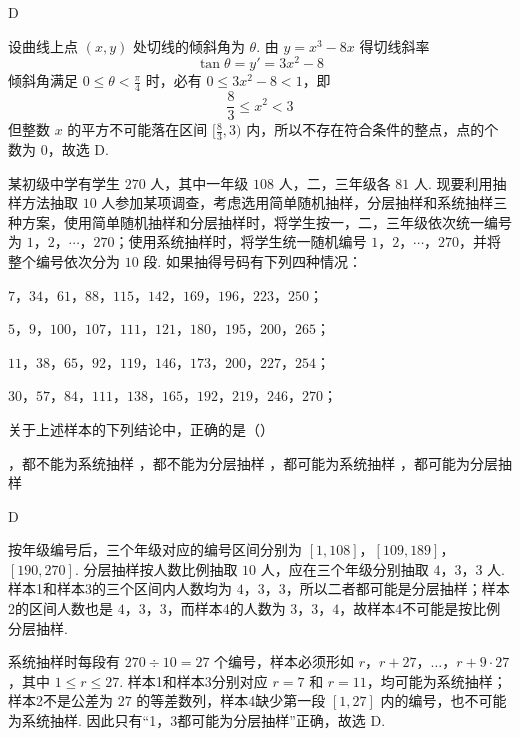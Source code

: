 \begin{answer}
D
\end{answer}

\begin{solution}
设曲线上点 \((x,y)\) 处切线的倾斜角为 \(\theta\). 由 \(y=x^3-8x\) 得切线斜率
\[
\tan\theta=y'=3x^2-8
\]
倾斜角满足 \(0\leqslant\theta<\frac\pi4\) 时，必有 \(0\leqslant3x^2-8<1\)，即
\[
\frac83\leqslant x^2<3
\]
但整数 \(x\) 的平方不可能落在区间 \([\frac83,3)\) 内，所以不存在符合条件的整点，点的个数为 \(0\)，故选 D.
\end{solution}

\begin{problem}
某初级中学有学生 \(270\) 人，其中一年级 \(108\) 人，二，三年级各 \(81\) 人. 现要利用抽样方法抽取 \(10\) 人参加某项调查，考虑选用简单随机抽样，分层抽样和系统抽样三种方案，使用简单随机抽样和分层抽样时，将学生按一，二，三年级依次统一编号为 \(1\)，\(2\)，\(\cdots\)，\(270\)；使用系统抽样时，将学生统一随机编号 \(1\)，\(2\)，\(\cdots\)，\(270\)，并将整个编号依次分为 \(10\) 段. 如果抽得号码有下列四种情况：

\begin{circlelist}
\item \(7\)，\(34\)，\(61\)，\(88\)，\(115\)，\(142\)，\(169\)，\(196\)，\(223\)，\(250\)；
\item \(5\)，\(9\)，\(100\)，\(107\)，\(111\)，\(121\)，\(180\)，\(195\)，\(200\)，\(265\)；
\item \(11\)，\(38\)，\(65\)，\(92\)，\(119\)，\(146\)，\(173\)，\(200\)，\(227\)，\(254\)；
\item \(30\)，\(57\)，\(84\)，\(111\)，\(138\)，\(165\)，\(192\)，\(219\)，\(246\)，\(270\)；
\end{circlelist}

关于上述样本的下列结论中，正确的是（\quad）

\choices
    {，都不能为系统抽样}
    {，都不能为分层抽样}
    {，都可能为系统抽样}
    {，都可能为分层抽样}
\end{problem}

\begin{answer}
D
\end{answer}

\begin{solution}
按年级编号后，三个年级对应的编号区间分别为 \([1,108]\)，\([109,189]\)，\([190,270]\). 分层抽样按人数比例抽取 \(10\) 人，应在三个年级分别抽取 \(4\)，\(3\)，\(3\) 人. 样本1和样本3的三个区间内人数均为 \(4\)，\(3\)，\(3\)，所以二者都可能是分层抽样；样本2的区间人数也是 \(4\)，\(3\)，\(3\)，而样本4的人数为 \(3\)，\(3\)，\(4\)，故样本4不可能是按比例分层抽样.

系统抽样时每段有 \(270\div10=27\) 个编号，样本必须形如 \(r\)，\(r+27\)，\(\ldots\)，\(r+9\cdot27\)，其中 \(1\leqslant r\leqslant27\). 样本1和样本3分别对应 \(r=7\) 和 \(r=11\)，均可能为系统抽样；样本2不是公差为 \(27\) 的等差数列，样本4缺少第一段 \([1,27]\) 内的编号，也不可能为系统抽样. 因此只有“1，3都可能为分层抽样”正确，故选 D.
\end{solution}

